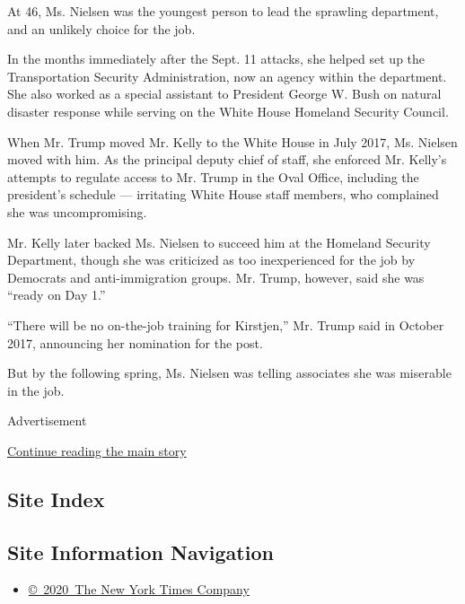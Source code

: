 At 46, Ms. Nielsen was the youngest person to lead the sprawling
department, and an unlikely choice for the job.

In the months immediately after the Sept. 11 attacks, she helped set up
the Transportation Security Administration, now an agency within the
department. She also worked as a special assistant to President George
W. Bush on natural disaster response while serving on the White House
Homeland Security Council.

When Mr. Trump moved Mr. Kelly to the White House in July 2017, Ms.
Nielsen moved with him. As the principal deputy chief of staff, she
enforced Mr. Kelly's attempts to regulate access to Mr. Trump in the
Oval Office, including the president's schedule --- irritating White
House staff members, who complained she was uncompromising.

Mr. Kelly later backed Ms. Nielsen to succeed him at the Homeland
Security Department, though she was criticized as too inexperienced for
the job by Democrats and anti-immigration groups. Mr. Trump, however,
said she was ``ready on Day 1.''

``There will be no on-the-job training for Kirstjen,'' Mr. Trump said in
October 2017, announcing her nomination for the post.

But by the following spring, Ms. Nielsen was telling associates she was
miserable in the job.

Advertisement

\protect\hyperlink{after-bottom}{Continue reading the main story}

\hypertarget{site-index}{%
\subsection{Site Index}\label{site-index}}

\hypertarget{site-information-navigation}{%
\subsection{Site Information
Navigation}\label{site-information-navigation}}

\begin{itemize}
\tightlist
\item
  \href{https://help.nytimes3xbfgragh.onion/hc/en-us/articles/115014792127-Copyright-notice}{©~2020~The
  New York Times Company}
\end{itemize}

